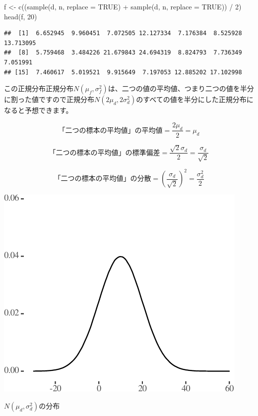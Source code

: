 \documentclass[]{tufte-handout}
\newenvironment{Shaded}{}{}
\newcommand{\AttributeTok}[1]{\textcolor[rgb]{0.49,0.56,0.16}{#1}}
\newcommand{\ConstantTok}[1]{\textcolor[rgb]{0.53,0.00,0.00}{#1}}
\newcommand{\DecValTok}[1]{\textcolor[rgb]{0.25,0.63,0.44}{#1}}
\newcommand{\FunctionTok}[1]{\textcolor[rgb]{0.02,0.16,0.49}{#1}}
\newcommand{\NormalTok}[1]{#1}
\newcommand{\OtherTok}[1]{\textcolor[rgb]{0.00,0.44,0.13}{#1}}
\newcommand{\SpecialCharTok}[1]{\textcolor[rgb]{0.25,0.44,0.63}{#1}}
\begin{document}
\begin{Shaded}
\begin{Highlighting}[numbers=left,,]
\NormalTok{f }\OtherTok{\textless{}{-}} \FunctionTok{c}\NormalTok{((}\FunctionTok{sample}\NormalTok{(d, n, }\AttributeTok{replace =} \ConstantTok{TRUE}\NormalTok{) }\SpecialCharTok{+} \FunctionTok{sample}\NormalTok{(d, n, }\AttributeTok{replace =} \ConstantTok{TRUE}\NormalTok{)) }\SpecialCharTok{/} \DecValTok{2}\NormalTok{)}
\FunctionTok{head}\NormalTok{(f, }\DecValTok{20}\NormalTok{)}
\end{Highlighting}
\end{Shaded}

\begin{verbatim}
##  [1]  6.652945  9.960451  7.072505 12.127334  7.176384  8.525928 13.713095
##  [8]  5.759468  3.484226 21.679843 24.694319  8.824793  7.736349  7.051991
## [15]  7.460617  5.019521  9.915649  7.197053 12.885202 17.102998
\end{verbatim}

この正規分布正規分布\(N(\mu_f, \sigma^2_f)\)は、二つの値の平均値、つまり二つの値を半分に割った値ですので正規分布\(N(2\mu_d, 2\sigma^2_d)\)のすべての値を半分にした正規分布になると予想できます。

\[\mbox{「二つの標本の平均値」の平均値} = \frac{2\mu_d}{2} = \mu_d\]

\[\mbox{「二つの標本の平均値」の標準偏差} = \frac{\sqrt{2}\sigma_d}{2} = \frac{\sigma_d}{\sqrt{2}}\]

\[\mbox{「二つの標本の平均値」の分散} = (\frac{\sigma_d}{\sqrt{2}})^2 = \frac{\sigma^2_d}{2}\]

\begin{marginfigure}

{\centering \includegraphics{AdditivityOfVariance_files/figure-latex/unnamed-chunk-11-1} 

}

\caption[$N(\mu_d, \sigma^2_d)$の分布]{$N(\mu_d, \sigma^2_d)$の分布}\label{fig:unnamed-chunk-11}
\end{marginfigure}
\end{document}
